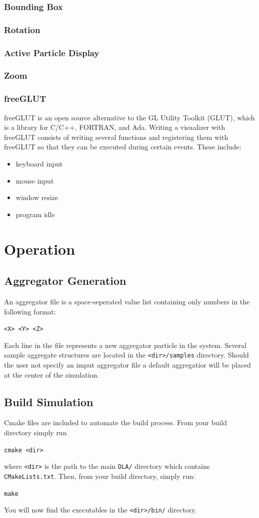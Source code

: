 \documentclass[fleqn,10pt]{SelfArx} %
\begin{document}
\subsubsection{Bounding Box}
\subsubsection{Rotation}
\subsubsection{Active Particle Display}
\subsubsection{Zoom}
\subsubsection{freeGLUT}
freeGLUT is an open source alternative to the GL Utility Toolkit (GLUT), which is a library for C/C++, FORTRAN, and Ada. Writing a visualizer with freeGLUT consists of writing several functions and registering them with freeGLUT so that they can be executed during certain events. These include:
\begin{itemize}
    \item keyboard input
    \item mouse input
    \item window resize
    \item program idle
\end{itemize}

\section{Operation}
\subsection{Aggregator Generation}
An aggregator file is a space-seperated value list containing only numbers in the following format:
\begin{center}
    \texttt{<X> <Y> <Z>}
\end{center}
Each line in the file represents a new aggregator particle in the system. Several sample aggregate structures are located in the \texttt{<dir>/samples} directory. Should the user not specify an imput aggregator file a default aggregatior will be placed at the center of the simulation.
\subsection{Build Simulation}
Cmake files are included to automate the build process. From your build directory simply run
\begin{center}
    \texttt{cmake <dir>}
\end{center}
where \texttt{<dir>} is the path to the main \texttt{DLA/} directory which contains \texttt{CMakeLists.txt}.
Then, from your build directory, simply run:
\begin{center}
    \texttt{make}
\end{center}
You will now find the executables in the \texttt{<dir>/bin/} directory.
\end{document}
